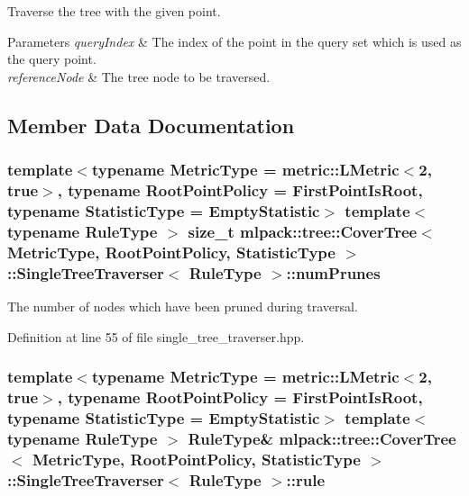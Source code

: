 Traverse the tree with the given point. 


\begin{DoxyParams}{Parameters}
{\em query\-Index} & The index of the point in the query set which is used as the query point. \\
\hline
{\em reference\-Node} & The tree node to be traversed. \\
\hline
\end{DoxyParams}


\subsection{Member Data Documentation}
\subsubsection[{num\-Prunes}]{\setlength{\rightskip}{0pt plus 5cm}template$<$typename Metric\-Type  = metric\-::\-L\-Metric$<$2, true$>$, typename Root\-Point\-Policy  = First\-Point\-Is\-Root, typename Statistic\-Type  = Empty\-Statistic$>$ template$<$typename Rule\-Type $>$ size\-\_\-t {\bf mlpack\-::tree\-::\-Cover\-Tree}$<$ Metric\-Type, Root\-Point\-Policy, Statistic\-Type $>$\-::{\bf Single\-Tree\-Traverser}$<$ Rule\-Type $>$\-::num\-Prunes\hspace{0.3cm}{\ttfamily [private]}}\label{classmlpack_1_1tree_1_1CoverTree_1_1SingleTreeTraverser_abc2c26566f4af2c4eda10734c5ee37c1}


The number of nodes which have been pruned during traversal. 



Definition at line 55 of file single\-\_\-tree\-\_\-traverser.\-hpp.

\subsubsection[{rule}]{\setlength{\rightskip}{0pt plus 5cm}template$<$typename Metric\-Type  = metric\-::\-L\-Metric$<$2, true$>$, typename Root\-Point\-Policy  = First\-Point\-Is\-Root, typename Statistic\-Type  = Empty\-Statistic$>$ template$<$typename Rule\-Type $>$ Rule\-Type\& {\bf mlpack\-::tree\-::\-Cover\-Tree}$<$ Metric\-Type, Root\-Point\-Policy, Statistic\-Type $>$\-::{\bf Single\-Tree\-Traverser}$<$ Rule\-Type $>$\-::rule\hspace{0.3cm}{\ttfamily [private]}}\label{classmlpack_1_1tree_1_1CoverTree_1_1SingleTreeTraverser_a34d096e41f60869f43bad96775cc9aec}


